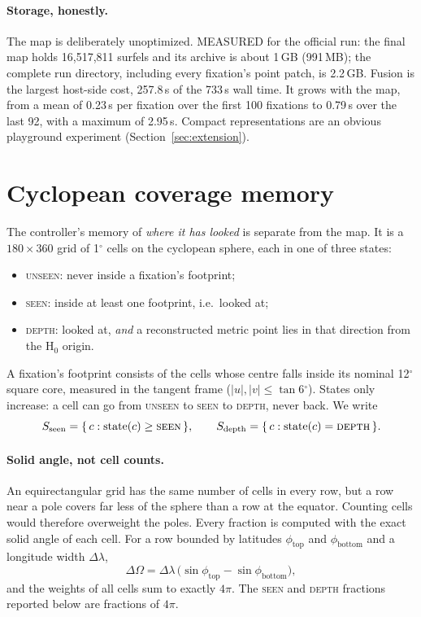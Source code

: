 \documentclass[11pt,a4paper]{article}
\newcommand{\Hz}{\ensuremath{\mathrm{H}_0}}
\newcommand{\degr}{\ensuremath{^\circ}}
\begin{document}
\paragraph{Storage, honestly.} The map is deliberately unoptimized. MEASURED for the official run: the final map holds
16{,}517{,}811 surfels and its archive is about 1\,GB (991\,MB); the complete run directory, including every
fixation's point patch, is 2.2\,GB. Fusion is the largest host-side cost, 257.8\,s of the 733\,s wall time. It grows
with the map, from a mean of 0.23\,s per fixation over the first 100 fixations to 0.79\,s over the last 92, with a
maximum of 2.95\,s. Compact representations are an obvious playground experiment (Section~\ref{sec:extension}).

\section{Cyclopean coverage memory}\label{sec:coverage}

The controller's memory of \emph{where it has looked} is separate from the map. It is a $180\times360$ grid of 1\degr{}
cells on the cyclopean sphere, each in one of three states:
\begin{itemize}
  \item \textsc{unseen}: never inside a fixation's footprint;
  \item \textsc{seen}: inside at least one footprint, i.e.\ looked at;
  \item \textsc{depth}: looked at, \emph{and} a reconstructed metric point lies in that direction from the \Hz{}
        origin.
\end{itemize}
A fixation's footprint consists of the cells whose centre falls inside its nominal 12\degr{} square core, measured in
the tangent frame ($|u|,|v| \le \tan 6\degr$). States only increase: a cell can go from \textsc{unseen} to
\textsc{seen} to \textsc{depth}, never back. We write
\[
  S_{\mathrm{seen}} = \{\,c : \mathrm{state}(c) \ge \textsc{seen}\,\}, \qquad
  S_{\mathrm{depth}} = \{\,c : \mathrm{state}(c) = \textsc{depth}\,\}.
\]

\paragraph{Solid angle, not cell counts.} An equirectangular grid has the same number of cells in every row, but a row
near a pole covers far less of the sphere than a row at the equator. Counting cells would therefore overweight the
poles. Every fraction is computed with the exact solid angle of each cell. For a row bounded by latitudes
$\phi_{\mathrm{top}}$ and $\phi_{\mathrm{bottom}}$ and a longitude width $\Delta\lambda$,
\begin{equation}
  \Delta\Omega = \Delta\lambda\,\bigl(\sin\phi_{\mathrm{top}} - \sin\phi_{\mathrm{bottom}}\bigr),
  \label{eq:solidangle}
\end{equation}
and the weights of all cells sum to exactly $4\pi$. The \textsc{seen} and \textsc{depth} fractions reported below are
fractions of $4\pi$.
\end{document}
